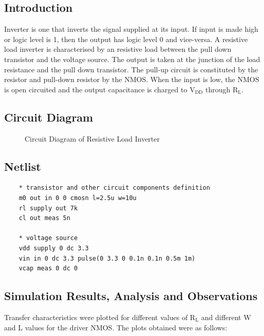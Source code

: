 \documentclass[12pt, a4paper]{article}
\begin{document}
	\subsection{Introduction}
	Inverter is one that inverts the signal supplied at its input. If input is made high or logic level is 1, then the output has logic level 0 and vice-versa. A resistive load inverter is characterised by an resistive load between the pull down transistor and the voltage source. The output is taken at the junction of the load resistance and the pull down transistor. The pull-up circuit is constituted by the resistor and pull-down resistor by the NMOS. When the input is low, the NMOS is open circuited and the output capacitance is charged to $\text{V}_\text{DD}$ through $\text{R}_\text{L}$.
	
	\subsection{Circuit Diagram}
	\begin{figure}[H]
		\begin{center}
			
			\caption{Circuit Diagram of Resistive Load Inverter}
			\label{fig::resloadckt}
		\end{center}
	\end{figure}
	
	\subsection{Netlist}
	\begin{lstlisting}
	* transistor and other circuit components definition
	m0 out in 0 0 cmosn l=2.5u w=10u
	rl supply out 7k
	cl out meas 5n
	
	* voltage source
	vdd supply 0 dc 3.3
	vin in 0 dc 3.3 pulse(0 3.3 0 0.1n 0.1n 0.5m 1m)
	vcap meas 0 dc 0
	\end{lstlisting}
	
	\subsection{Simulation Results, Analysis and Observations}
	
	Transfer characteristics were plotted for different values of $\text{R}_\text{L}$ and different W and L values for the driver NMOS. The plots obtained were as follows:
	
\end{document}
